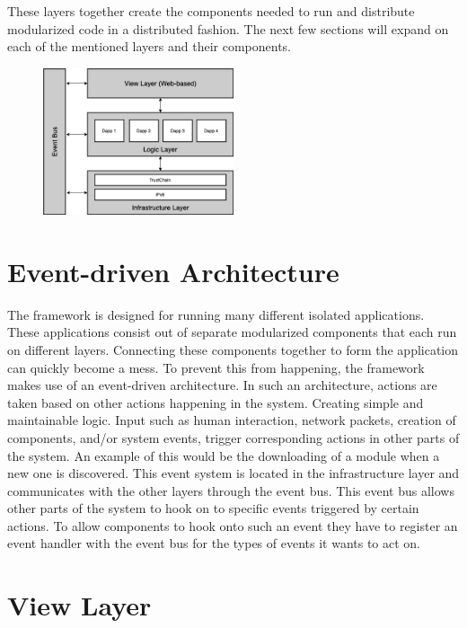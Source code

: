 These layers together create the components needed to run and distribute modularized code in a distributed fashion. The next few sections will expand on each of the mentioned layers and their components.


\begin{figure}[h]
	\centering
	\includegraphics[width=0.5\textwidth]{images/architecture.png}
	\caption{\label{fig:architecture}}
\end{figure}

\section{Event-driven Architecture}


The framework is designed for running many different isolated applications. These applications consist out of separate modularized components that each run on different layers. Connecting these components together to form the application can quickly become a mess. To prevent this from happening, the framework makes use of an event-driven architecture. In such an architecture, actions are taken based on other actions happening in the system. Creating simple and maintainable logic. Input such as human interaction, network packets, creation of components, and/or system events, trigger corresponding actions in other parts of the system. An example of this would be the downloading of a module when a new one is discovered. This event system is located in the infrastructure layer and communicates with the other layers through the event bus. This event bus allows other parts of the system to hook on to specific events triggered by certain actions. To allow components to hook onto such an event they have to register an event handler with the event bus for the types of events it wants to act on.

\section{View Layer}

